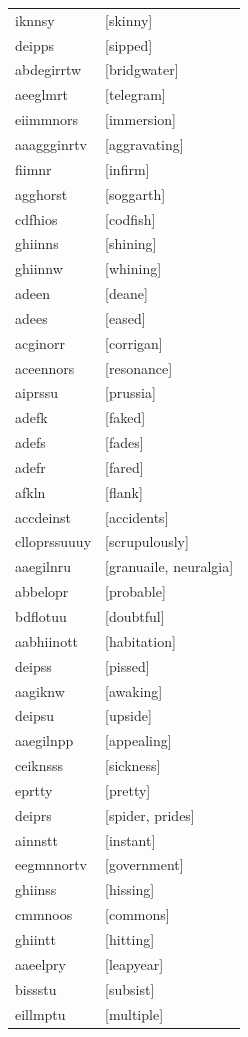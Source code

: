 \documentclass{article}
\begin{document}
\begin{tabular}{ll}
iknnsy & [skinny] \\
deipps & [sipped] \\
abdegirrtw & [bridgwater] \\
aeeglmrt & [telegram] \\
eiimmnors & [immersion] \\
aaaggginrtv & [aggravating] \\
fiimnr & [infirm] \\
agghorst & [soggarth] \\
cdfhios & [codfish] \\
ghiinns & [shining] \\
ghiinnw & [whining] \\
adeen & [deane] \\
adees & [eased] \\
acginorr & [corrigan] \\
aceennors & [resonance] \\
aiprssu & [prussia] \\
adefk & [faked] \\
adefs & [fades] \\
adefr & [fared] \\
afkln & [flank] \\
accdeinst & [accidents] \\
clloprssuuuy & [scrupulously] \\
aaegilnru & [granuaile, neuralgia] \\
abbelopr & [probable] \\
bdflotuu & [doubtful] \\
aabhiinott & [habitation] \\
deipss & [pissed] \\
aagiknw & [awaking] \\
deipsu & [upside] \\
aaegilnpp & [appealing] \\
ceiknsss & [sickness] \\
eprtty & [pretty] \\
deiprs & [spider, prides] \\
ainnstt & [instant] \\
eegmnnortv & [government] \\
ghiinss & [hissing] \\
cmmnoos & [commons] \\
ghiintt & [hitting] \\
aaeelpry & [leapyear] \\
bissstu & [subsist] \\
eillmptu & [multiple] \\

\end{tabular}
\end{document}
